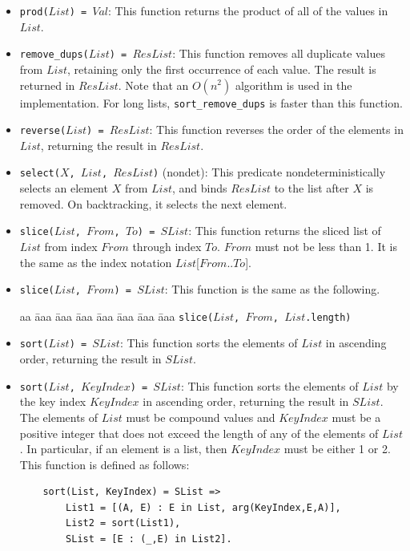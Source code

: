 \begin{itemize}
\item \texttt{prod($List$) = $Val$}: This function returns the product of all of the values in $List$. 
\item \texttt{remove\_dups($List$) = $ResList$}: This function removes all duplicate values from $List$, retaining only the first occurrence of each value.  The result is returned in $ResList$. Note that an $O(n^2)$ algorithm is used in the implementation. For long lists, \texttt{sort\_remove\_dups} is faster than this function.
\item \texttt{reverse($List$) = $ResList$}: This function reverses the order of the elements in $List$, returning the result in $ResList$. 
\item \texttt{select($X$, $List$, $ResList$)} (nondet): This predicate nondeterministically selects an element $X$ from $List$, and binds $ResList$ to the list after $X$ is removed. On backtracking, it selects the next element.

\item \texttt{slice($List$, $From$, $To$) = $SList$}: This function returns the sliced list of $List$ from index $From$ through index $To$. $From$ must not be less than 1. It is the same as the index notation $List$[$From$..$To$].

\item \texttt{slice($List$, $From$) = $SList$}: This function is the same as the following.
\begin{tabbing}
aa \= aaa \= aaa \= aaa \=aaa \= aaa \= aaa \= aaa \kill
\> \texttt{slice($List$, $From$, $List$.length)}
\end{tabbing}

\item \texttt{sort($List$) = $SList$}: This function sorts the elements of $List$ in ascending order, returning the result in $SList$. 
\item \texttt{sort($List$, $KeyIndex$) = $SList$}: This function sorts the elements of $List$ by the key index $KeyIndex$ in ascending order, returning the result in $SList$. The elements of $List$ must be compound values and $KeyIndex$ must be a positive integer that does not exceed the length of any of the elements of $List$. In particular, if an element is a list, then $KeyIndex$ must be either 1 or 2. This function is defined as follows:
\begin{verbatim}
    sort(List, KeyIndex) = SList =>
        List1 = [(A, E) : E in List, arg(KeyIndex,E,A)],
        List2 = sort(List1),
        SList = [E : (_,E) in List2].
\end{verbatim}


\end{itemize}
